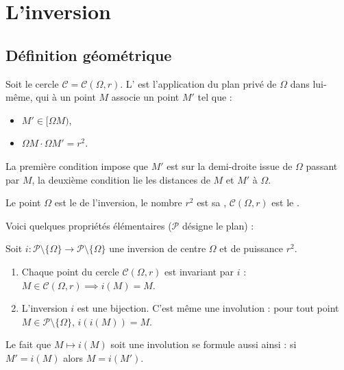 \documentclass[11pt,class=report,crop=false]{standalone}
\newcommand{\inversion}{i}
\begin{document}
\section{L'inversion}

\subsection{Définition géométrique}

Soit le cercle $\mathcal{C} = \mathcal{C}(\Omega,r)$. L' est l'application
du plan privé de $\Omega$ dans lui-même, qui à un point $M$ associe un point $M'$ tel que :
\begin{itemize}
  \item $M' \in [\Omega M)$,
  \item $\Omega M \cdot \Omega M' = r^2$.
\end{itemize}


La première condition impose que $M'$ est sur la demi-droite issue de $\Omega$ passant par $M$,
la deuxième condition lie les distances de $M$ et $M'$ à $\Omega$.

Le point $\Omega$ est le  de l'inversion, le nombre
$r^2$ est sa , $\mathcal{C}(\Omega,r)$ est le .

Voici quelques propriétés élémentaires ($\mathcal{P}$ désigne le plan) :
\begin{proposition}
Soit $\inversion : \mathcal{P} \setminus \{\Omega\} \to \mathcal{P} \setminus \{\Omega\}$ une inversion de centre $\Omega$ et de puissance $r^2$.
\begin{enumerate}
  \item Chaque point du cercle $\mathcal{C}(\Omega,r)$ est invariant par $\inversion$ :
  $M \in \mathcal{C}(\Omega,r) \implies \inversion(M) = M$.
  
  \item L'inversion $\inversion$ est une bijection. 
  C'est même une involution : pour tout point $M \in \mathcal{P} \setminus \{\Omega\}$, $\inversion(\inversion(M)) = M$.
\end{enumerate}
\end{proposition}

Le fait que $M \mapsto \inversion(M)$ soit une involution se formule aussi ainsi : si $M'=\inversion(M)$ alors 
$M = \inversion(M')$.
\end{document}
